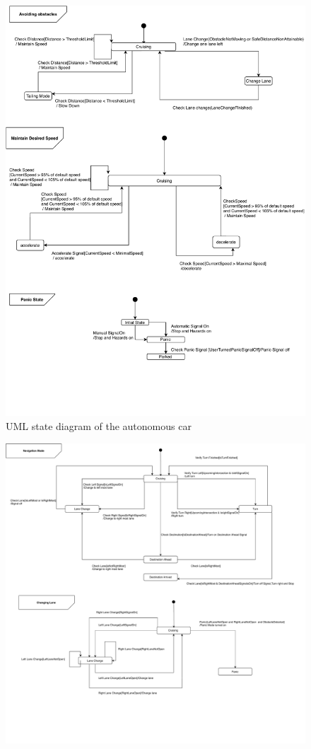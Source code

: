\documentclass[12pt]{article}
\begin{document}
\begin{spacing}{1.5}
\begin{figure}[h!]
		\includegraphics[width=1\textwidth]{./figures/CruiseMode-p2}
		  \caption{UML state diagram of the autonomous car}
  \label{fig:state-diagram}
\end{figure}
\begin{figure}[h!]
	\centering
		\includegraphics[width=1\textwidth]{./figures/CruiseMode-p3}

\end{figure}
\end{spacing}
\end{document}
